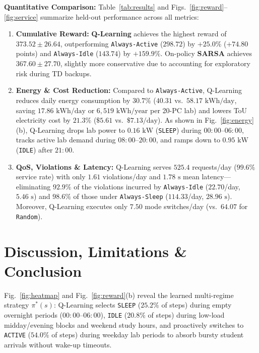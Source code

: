 \documentclass[9pt,twocolumn,a4paper]{extarticle}
\begin{document}
\textbf{Quantitative Comparison:} Table~\ref{tab:results} and Figs.~\ref{fig:reward}--\ref{fig:service} summarize held-out performance across all metrics:
\begin{enumerate}[leftmargin=*,nosep,topsep=1pt]
    \item \textbf{Cumulative Reward:} \textbf{Q-Learning} achieves the highest reward of $\mathbf{373.52 \pm 26.64}$, outperforming \texttt{Always-Active} ($298.72$) by $\mathbf{+25.0\%}$ ($+74.80$ points) and \texttt{Always-Idle} ($143.74$) by $\mathbf{+159.9\%}$. On-policy \textbf{SARSA} achieves $367.60 \pm 27.70$, slightly more conservative due to accounting for exploratory risk during TD backups.
    \item \textbf{Energy \& Cost Reduction:} Compared to \texttt{Always-Active}, Q-Learning reduces daily energy consumption by $\mathbf{30.7\%}$ ($40.31$ vs.\ $58.17\text{ kWh/day}$, saving $17.86\text{ kWh/day}$ or $6,519\text{ kWh/year}$ per 20-PC lab) and lowers ToU electricity cost by $\mathbf{21.3\%}$ ($\$5.61$ vs.\ $\$7.13/\text{day}$). As shown in Fig.~\ref{fig:energy}(b), Q-Learning drops lab power to $0.16\text{ kW}$ (\texttt{SLEEP}) during $00{:}00\text{--}06{:}00$, tracks active lab demand during $08{:}00\text{--}20{:}00$, and ramps down to $0.95\text{ kW}$ (\texttt{IDLE}) after $21{:}00$.
    \item \textbf{QoS, Violations \& Latency:} Q-Learning serves $525.4$ requests/day ($\mathbf{99.6\%}$ service rate) with only $1.61$ violations/day and $1.78\text{ s}$ mean latency---eliminating $92.9\%$ of the violations incurred by \texttt{Always-Idle} ($22.70$/day, $5.46\text{ s}$) and $98.6\%$ of those under \texttt{Always-Sleep} ($114.33$/day, $28.96\text{ s}$). Moreover, Q-Learning executes only $7.50$ mode switches/day (vs.\ $64.07$ for \texttt{Random}).
\end{enumerate}

\section{Discussion, Limitations \& Conclusion}
Fig.~\ref{fig:heatmap} and Fig.~\ref{fig:reward}(b) reveal the learned multi-regime strategy $\pi^*(s)$: Q-Learning selects \texttt{SLEEP} ($25.2\%$ of steps) during empty overnight periods ($00{:}00\text{--}06{:}00$), \texttt{IDLE} ($20.8\%$ of steps) during low-load midday/evening blocks and weekend study hours, and proactively switches to \texttt{ACTIVE} ($54.0\%$ of steps) during weekday lab periods to absorb bursty student arrivals without wake-up timeouts.
\end{document}

